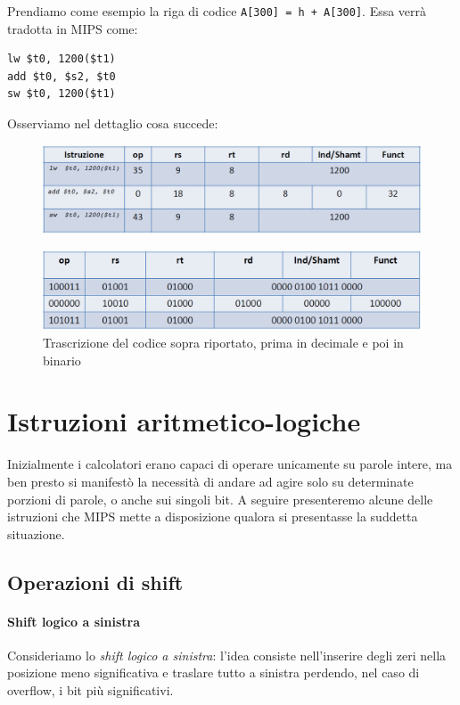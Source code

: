 \documentclass[class=book, crop=false]{standalone}
\begin{document}
Prendiamo come esempio la riga di codice \texttt{A[300] = h + A[300]}. Essa verrà tradotta in MIPS come:
\begin{verbatim}
lw $t0, 1200($t1)
add $t0, $s2, $t0
sw $t0, 1200($t1)
\end{verbatim}
Osserviamo nel dettaglio cosa succede:
\begin{figure}[H]
	\centering
	\includegraphics[width=1\textwidth,keepaspectratio]{nat.png}
\end{figure}
\begin{figure}[H]
	\centering
	\includegraphics[width=1\textwidth,keepaspectratio]{bin.png}
	\caption{Trascrizione del codice sopra riportato, prima in decimale e poi in binario}
\end{figure}

\section{Istruzioni aritmetico-logiche}

Inizialmente i calcolatori erano capaci di operare unicamente su parole intere, ma ben presto si manifestò la necessità di andare ad agire solo su determinate porzioni di parole, o anche sui singoli bit. A seguire presenteremo alcune delle istruzioni che MIPS mette a disposizione qualora si presentasse la suddetta situazione.

\subsection{Operazioni di shift}

\paragraph{Shift logico a sinistra}
Consideriamo lo \emph{shift logico a sinistra}: l'idea consiste nell'inserire degli zeri nella posizione meno significativa e traslare tutto a sinistra perdendo, nel caso di overflow, i bit più significativi.
\end{document}
